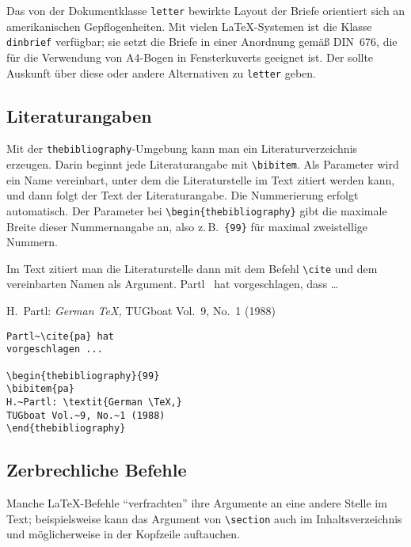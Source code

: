 Das von der Dokumentklasse \texttt{letter} bewirkte Layout der Briefe 
orientiert sich an amerikanischen Gepflogenheiten.
Mit vielen \LaTeX-Systemen ist die Klasse 
\texttt{dinbrief} verfügbar; sie setzt die Briefe in einer
Anordnung gemäß DIN~676, 
die für die Verwendung von A4-Bogen in Fensterkuverts geeignet ist.
Der \local{} sollte Auskunft über diese oder andere Alternativen zu
\texttt{letter} geben.

\subsection{Literaturangaben}

Mit der \texttt{thebibliography}-Umgebung kann man ein
Literaturverzeichnis erzeugen.
Darin beginnt jede Literaturangabe mit \verb|\bibitem|.
Als Parameter wird ein Name vereinbart, unter dem die
Literaturstelle im Text zitiert werden kann, und
dann folgt der Text der Literaturangabe.
Die Nummerierung erfolgt automatisch.
Der Parameter bei \verb|\begin{thebibliography}| gibt die
maximale Breite dieser Nummernangabe an, also z.\,B.\ 
\verb|{99}| für maximal zweistellige Nummern.

Im Text zitiert man die Literaturstelle dann mit dem Befehl \verb|\cite|
und dem vereinbarten Namen als Argument.
\exa
Partl~\cite{pa} hat
vorgeschlagen, dass \dots
 
\begin{thebibliography}{99}
H.~Partl: \textit{German \TeX,}
TUG\-boat Vol.~9, No.~1 (1988)
\end{thebibliography}
\exb
\begin{verbatim}
Partl~\cite{pa} hat
vorgeschlagen ...
 
\begin{thebibliography}{99}
\bibitem{pa}
H.~Partl: \textit{German \TeX,}
TUGboat Vol.~9, No.~1 (1988)
\end{thebibliography}
\end{verbatim}
\exc

 
\subsection{Zerbrechliche Befehle}
 
Manche \LaTeX-Befehle "`verfrachten"' ihre Argumente an eine andere
Stelle im Text; beispielsweise kann das Argument von \verb|\section|
auch im Inhaltsverzeichnis und möglicherweise in der Kopfzeile auftauchen.  

